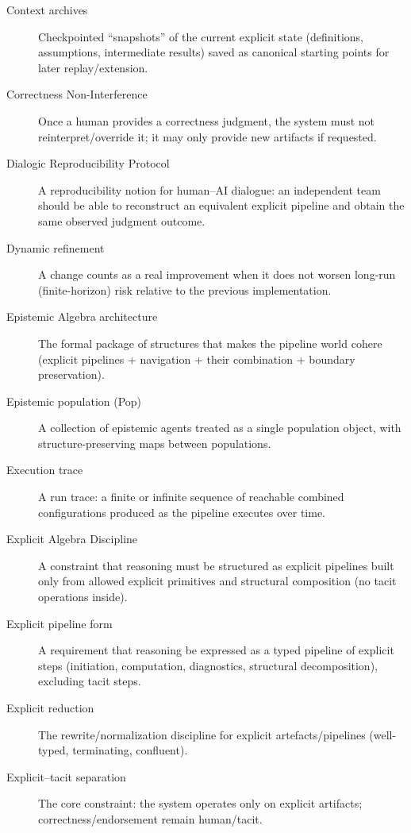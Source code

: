 \begin{description}
\item[Context archives] Checkpointed “snapshots” of the current explicit state (definitions, assumptions, intermediate results) saved as canonical starting points for later replay/extension.

\item[Correctness Non-Interference] Once a human provides a correctness judgment, the system must not reinterpret/override it; it may only provide new artifacts if requested.

\item[Dialogic Reproducibility Protocol] A reproducibility notion for human--AI dialogue: an independent team should be able to reconstruct an equivalent explicit pipeline and obtain the same observed judgment outcome.

\item[Dynamic refinement] A change counts as a real improvement when it does not worsen long-run (finite-horizon) risk relative to the previous implementation.

\item[Epistemic Algebra architecture] The formal package of structures that makes the pipeline world cohere (explicit pipelines + navigation + their combination + boundary preservation).

\item[Epistemic population (Pop)] A collection of epistemic agents treated as a single population object, with structure-preserving maps between populations.

\item[Execution trace] A run trace: a finite or infinite sequence of reachable combined configurations produced as the pipeline executes over time.

\item[Explicit Algebra Discipline] A constraint that reasoning must be structured as explicit pipelines built only from allowed explicit primitives and structural composition (no tacit operations inside).

\item[Explicit pipeline form] A requirement that reasoning be expressed as a typed pipeline of explicit steps (initiation, computation, diagnostics, structural decomposition), excluding tacit steps.

\item[Explicit reduction] The rewrite/normalization discipline for explicit artefacts/pipelines (well-typed, terminating, confluent).

\item[Explicit--tacit separation] The core constraint: the system operates only on explicit artifacts; correctness/endorsement remain human/tacit.


\end{description}
